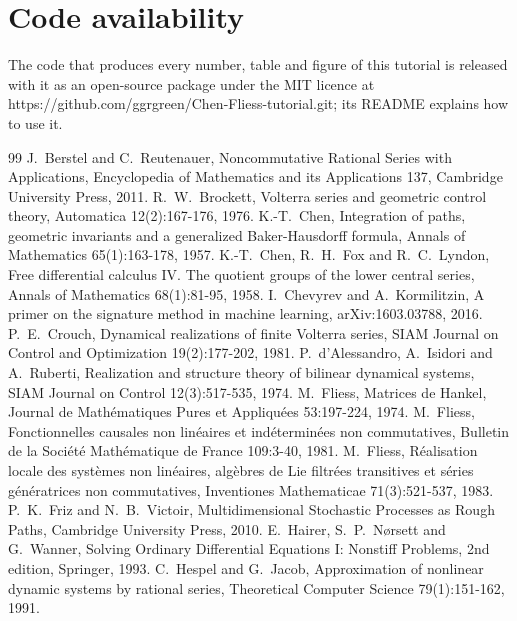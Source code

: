 \documentclass[11pt,a4paper]{article}
\theoremstyle{remark}
\begin{document}
\section*{Code availability}
The code that produces every number, table and figure of this tutorial is released with it as an open-source package under the MIT licence at https://github.com/ggrgreen/Chen-Fliess-tutorial.git; its README explains how to use it.

\begin{thebibliography}{99}
 J.~Berstel and C.~Reutenauer, Noncommutative Rational Series with Applications, Encyclopedia of Mathematics and its Applications 137, Cambridge University Press, 2011.
 R.~W.~Brockett, Volterra series and geometric control theory, Automatica 12(2):167-176, 1976.
 K.-T.~Chen, Integration of paths, geometric invariants and a generalized Baker-Hausdorff formula, Annals of Mathematics 65(1):163-178, 1957.
 K.-T.~Chen, R.~H.~Fox and R.~C.~Lyndon, Free differential calculus IV. The quotient groups of the lower central series, Annals of Mathematics 68(1):81-95, 1958.
 I.~Chevyrev and A.~Kormilitzin, A primer on the signature method in machine learning, arXiv:1603.03788, 2016.
 P.~E.~Crouch, Dynamical realizations of finite Volterra series, SIAM Journal on Control and Optimization 19(2):177-202, 1981.
 P.~d'Alessandro, A.~Isidori and A.~Ruberti, Realization and structure theory of bilinear dynamical systems, SIAM Journal on Control 12(3):517-535, 1974.
 M.~Fliess, Matrices de Hankel, Journal de Math\'ematiques Pures et Appliqu\'ees 53:197-224, 1974.
 M.~Fliess, Fonctionnelles causales non lin\'eaires et ind\'etermin\'ees non commutatives, Bulletin de la Soci\'et\'e Math\'ematique de France 109:3-40, 1981.
 M.~Fliess, R\'ealisation locale des syst\`emes non lin\'eaires, alg\`ebres de Lie filtr\'ees transitives et s\'eries g\'en\'eratrices non commutatives, Inventiones Mathematicae 71(3):521-537, 1983.
 P.~K.~Friz and N.~B.~Victoir, Multidimensional Stochastic Processes as Rough Paths, Cambridge University Press, 2010.
 E.~Hairer, S.~P.~N{\o}rsett and G.~Wanner, Solving Ordinary Differential Equations I: Nonstiff Problems, 2nd edition, Springer, 1993.
 C.~Hespel and G.~Jacob, Approximation of nonlinear dynamic systems by rational series, Theoretical Computer Science 79(1):151-162, 1991.

\end{thebibliography}
\end{document}
